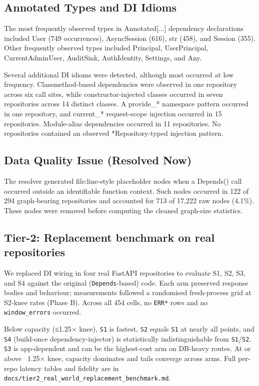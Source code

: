 \subsection{Annotated Types and DI Idioms}

The most frequently observed types in Annotated[...] dependency declarations included User (749 occurrences), AsyncSession (616), str (458), and Session (355). Other frequently observed types included Principal, UserPrincipal, CurrentAdminUser, AuditSink, AuthIdentity, Settings, and Any.

Several additional DI idioms were detected, although most occurred at low frequency. Classmethod-based dependencies were observed in one repository across six call sites, while constructor-injected classes occurred in seven repositories across 14 distinct classes. A provide\_* namespace pattern occurred in one repository, and current\_* request-scope injection occurred in 15 repositories. Module-alias dependencies occurred in 11 repositories. No repositories contained an observed *Repository-typed injection pattern.

\subsection{Data Quality Issue (Resolved Now)}

The resolver generated file:line-style placeholder nodes when a Depends() call occurred outside an identifiable function context. Such nodes occurred in 122 of 294 graph-bearing repositories and accounted for 713 of 17,222 raw nodes (4.1\%). These nodes were removed before computing the cleaned graph-size statistics.
\subsection{Tier-2: Replacement benchmark on real repositories}

We replaced DI wiring in four real FastAPI repositories to evaluate S1, S2, S3, and S4 against the original (\texttt{Depends}-based) code. Each arm preserved response bodies and behaviour; measurements followed a randomised fresh-process grid at S2-knee rates (Phase B). Across all 454 cells, no \texttt{ERR*} rows and no \texttt{window_errors} occurred.

Below capacity (≤1.25× knee), \texttt{S1} is fastest, \texttt{S2} equals \texttt{S1} at nearly all points, and \texttt{S4} (build-once dependency-injector) is statistically indistinguishable from \texttt{S1}/\texttt{S2}. \texttt{S3} is app-dependent and can be the highest-cost arm on DB-heavy routes. At or above ~1.25× knee, capacity dominates and tails converge across arms. Full per-repo latency tables and fidelity are in \texttt{docs/tier2_real_world_replacement_benchmark.md}.

